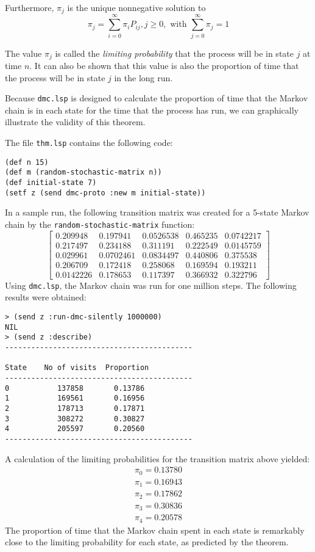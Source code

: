 Furthermore, $\pi_{j}$ is the unique nonnegative solution to
\[ \pi_{j} = \sum_{i=0}^{\infty} \pi_{i}P_{ij},  j \geq 0, 
\mbox{ with } \sum_{j=0}^{\infty} \pi_{j} = 1 \]

The value $\pi_{j}$ is called the {\em limiting probability} that the
process will be in state $j$ at time $n$.  It can also be shown that
this value is  also the proportion of time that the process will be in
state $j$ in the long run. 

Because {\tt dmc.lsp} is designed to calculate the proportion of time that 
the Markov chain is in each state for the time that the process has
run, we  can graphically illustrate the validity of this theorem.

The file {\tt thm.lsp} contains the following code:
\begin{verbatim}
(def n 15)
(def m (random-stochastic-matrix n))
(def initial-state 7)
(setf z (send dmc-proto :new m initial-state))
\end{verbatim}
In a sample run, the following transition matrix was created for a
5-state Markov chain by the {\tt random-stochastic-matrix} function:
\[ \left[ \begin{array}{ccccc}
	0.209948  & 0.197941  & 0.0526538 & 0.465235 & 0.0742217 \\
	0.217497  & 0.234188  & 0.311191  & 0.222549 & 0.0145759 \\
	0.029961  & 0.0702461 & 0.0834497 & 0.440806 & 0.375538  \\
	0.206709  & 0.172418  & 0.258068  & 0.169594 & 0.193211  \\
	0.0142226 & 0.178653  & 0.117397  & 0.366932 & 0.322796  
	  \end{array} \right] \]
Using {\tt dmc.lsp}, the Markov chain was run for one million steps.
The following results were obtained:
\begin{verbatim}
> (send z :run-dmc-silently 1000000)
NIL
> (send z :describe)
-------------------------------------------

State    No of visits  Proportion
-------------------------------------------
0           137858       0.13786
1           169561       0.16956
2           178713       0.17871
3           308272       0.30827
4           205597       0.20560
-------------------------------------------
\end{verbatim}
A calculation of the limiting probabilities for the transition matrix
above yielded:
\[ \begin{array}{c}
	\pi_{0}=0.13780 \\ 
   	\pi_{1}=0.16943 \\
   	\pi_{2}=0.17862 \\
   	\pi_{3}=0.30836 \\
   	\pi_{4}=0.20578
   \end{array} \]
The proportion of time that the Markov chain spent in each state is
remarkably close to the limiting probability for each state, as
predicted by the theorem.









